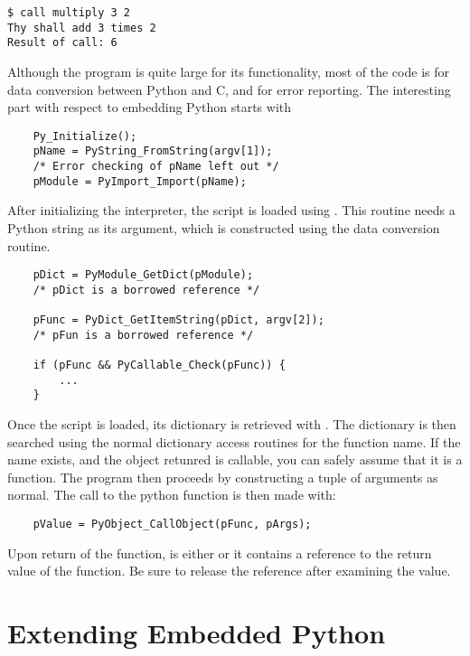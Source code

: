 \begin{verbatim}
$ call multiply 3 2
Thy shall add 3 times 2
Result of call: 6
\end{verbatim} %

Although the program is quite large for its functionality, most of the
code is for data conversion between Python and C, and for error
reporting.  The interesting part with respect to embedding Python
starts with

\begin{verbatim}
    Py_Initialize();
    pName = PyString_FromString(argv[1]);
    /* Error checking of pName left out */
    pModule = PyImport_Import(pName);
\end{verbatim}

After initializing the interpreter, the script is loaded using
.  This routine needs a Python string
as its argument, which is constructed using the
 data conversion routine.

\begin{verbatim}
    pDict = PyModule_GetDict(pModule);
    /* pDict is a borrowed reference */

    pFunc = PyDict_GetItemString(pDict, argv[2]);
    /* pFun is a borrowed reference */

    if (pFunc && PyCallable_Check(pFunc)) {
        ...
    }
\end{verbatim}

Once the script is loaded, its dictionary is retrieved with
.  The dictionary is then searched using
the normal dictionary access routines for the function name.  If the
name exists, and the object retunred is callable, you can safely
assume that it is a function.  The program then proceeds by
constructing a tuple of arguments as normal.  The call to the python
function is then made with:

\begin{verbatim}
    pValue = PyObject_CallObject(pFunc, pArgs);
\end{verbatim}

Upon return of the function,  is either \NULL{} or it
contains a reference to the return value of the function.  Be sure to
release the reference after examining the value.


\section{Extending Embedded Python
         \label{extending-with-embedding}}

